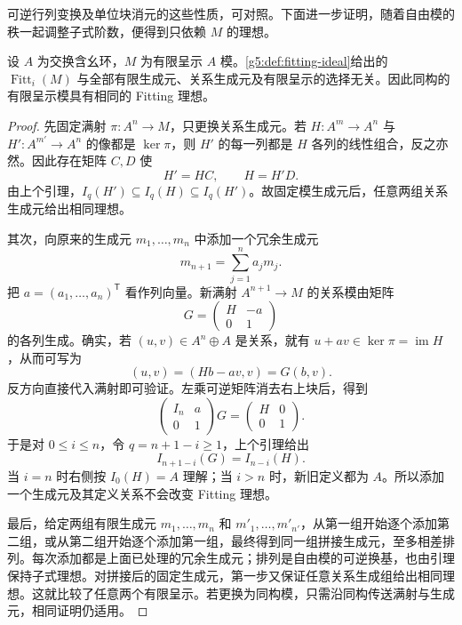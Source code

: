 可逆行列变换及单位块消元的这些性质，可对照\cite[第13节附录，第103页]{Matsumura1989}。下面进一步证明，随着自由模的秩一起调整子式阶数，便得到只依赖 \(M\) 的理想。

\begin{theorem}\label{g5:thm:fitting-invariance}
	设 \(A\) 为交换含幺环，\(M\) 为有限呈示 \(A\) 模。\cref{g5:def:fitting-ideal}给出的 \(\operatorname{Fitt}_i(M)\) 与全部有限生成元、关系生成元及有限呈示的选择无关。因此同构的有限呈示模具有相同的 Fitting 理想。
\end{theorem}
\begin{proof}
	先固定满射 \(\pi:A^n\to M\)，只更换关系生成元。若 \(H:A^m\to A^n\) 与 \(H':A^{m'}\to A^n\) 的像都是 \(\ker\pi\)，则 \(H'\) 的每一列都是 \(H\) 各列的线性组合，反之亦然。因此存在矩阵 \(C,D\) 使
	\[
		H'=HC,\qquad H=H'D.
	\]
	由上个引理，\(I_q(H')\subseteq I_q(H)\subseteq I_q(H')\)。故固定模生成元后，任意两组关系生成元给出相同理想。

	其次，向原来的生成元 \(m_1,\ldots,m_n\) 中添加一个冗余生成元
	\[
		m_{n+1}=\sum_{j=1}^n a_jm_j.
	\]
	把 \(a=(a_1,\ldots,a_n)^{\mathsf T}\) 看作列向量。新满射 \(A^{n+1}\to M\) 的关系模由矩阵
	\[
		G=\begin{pmatrix}H&-a\\0&1\end{pmatrix}
	\]
	的各列生成。确实，若 \((u,v)\in A^n\oplus A\) 是关系，就有 \(u+av\in\ker\pi=\operatorname{im}H\)，从而可写为
	\[
		(u,v)=(Hb-av,v)=G(b,v).
	\]
	反方向直接代入满射即可验证。左乘可逆矩阵消去右上块后，得到
	\[
		\begin{pmatrix}I_n&a\\0&1\end{pmatrix}G
		=\begin{pmatrix}H&0\\0&1\end{pmatrix}.
	\]
	于是对 \(0\leq i\leq n\)，令 \(q=n+1-i\geq1\)，上个引理给出
	\[
		I_{n+1-i}(G)=I_{n-i}(H).
	\]
	当 \(i=n\) 时右侧按 \(I_0(H)=A\) 理解；当 \(i>n\) 时，新旧定义都为 \(A\)。所以添加一个生成元及其定义关系不会改变 Fitting 理想。

	最后，给定两组有限生成元 \(m_1,\ldots,m_n\) 和 \(m'_1,\ldots,m'_{n'}\)，从第一组开始逐个添加第二组，或从第二组开始逐个添加第一组，最终得到同一组拼接生成元，至多相差排列。每次添加都是上面已处理的冗余生成元；排列是自由模的可逆换基，也由引理保持子式理想。对拼接后的固定生成元，第一步又保证任意关系生成组给出相同理想。这就比较了任意两个有限呈示。若更换为同构模，只需沿同构传送满射与生成元，相同证明仍适用。
\end{proof}

